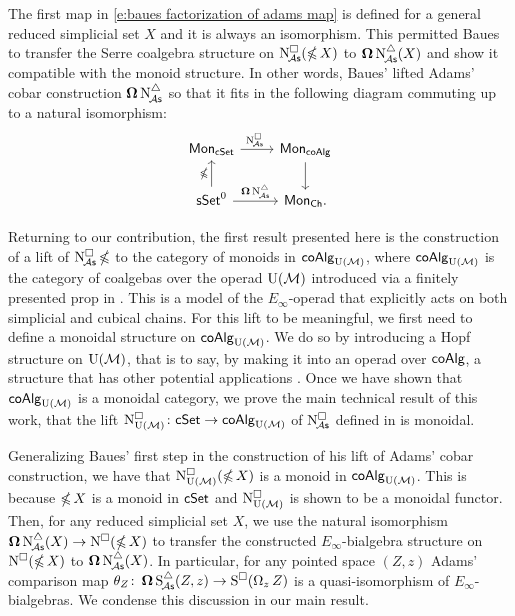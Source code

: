 The first map in \eqref{e:baues factorization of adams map} is defined for a general reduced simplicial set $X$ and it is always an isomorphism.
This permitted Baues to transfer the Serre coalgebra structure on $\cchainsA(\ccobar X)$ to $\cobar \schainsA(X)$ and show it compatible with the monoid structure.
In other words, Baues' lifted Adams' cobar construction $\cobar \schainsA$ so that it fits in the following diagram commuting up to a natural isomorphism:
\[
\begin{tikzcd}
\Mon_{\cSet} \arrow[r, "\cchainsA \ "] & \Mon_{\coAlg} \arrow[d] \\
\sSet^0 \arrow[r, "\cobar \schainsA"] \arrow[u, "\ccobar"] & \Mon_{\Ch}.
\end{tikzcd}
\]


Returning to our contribution, the first result presented here is the construction of a lift of $\cchainsA \ccobar$ to the category of monoids in $\coAlg_\UM$, where $\coAlg_\UM$ is the category of coalgebas over the operad $\UM$ introduced via a finitely presented prop in \cite{medina2020prop1}.
This is a model of the $E_\infty$-operad that explicitly acts on both simplicial and cubical chains.
For this lift to be meaningful, we first need to define a monoidal structure on $\coAlg_\UM$.
We do so by introducing a Hopf structure on $\UM$, that is to say, by making it into an operad over $\coAlg$, a structure that has other potential applications \cite{livernet2008hopf}.
Once we have shown that $\coAlg_\UM$ is a monoidal category, we prove the main technical result of this work, that the lift $\cchainsUM \colon \cSet \to \coAlg_\UM$ of $\cchainsA$ defined in \cite{medina2021cubical} is monoidal.


Generalizing Baues' first step in the construction of his lift of Adams' cobar construction, we have that $\cchainsUM(\ccobar X)$ is a monoid in $\coAlg_\UM$.
This is because $\ccobar X$ is a monoid in $\cSet$ and $\cchainsUM$ is shown to be a monoidal functor.
Then, for any reduced simplicial set $X$, we use the natural isomorphism $\cobar \schainsA(X) \to \cchains(\ccobar X)$ to transfer the constructed $E_{\infty}$-bialgebra structure on $\cchains(\ccobar X)$ to $\cobar \schainsA(X)$.
In particular, for any pointed space $(Z,z)$ Adams' comparison map $\theta_Z \colon \cobar \sSchainsA(Z,z) \to \cSchains(\loops_z Z)$ is a quasi-isomorphism of $E_{\infty}$-bialgebras.
We condense this discussion in our main result.

